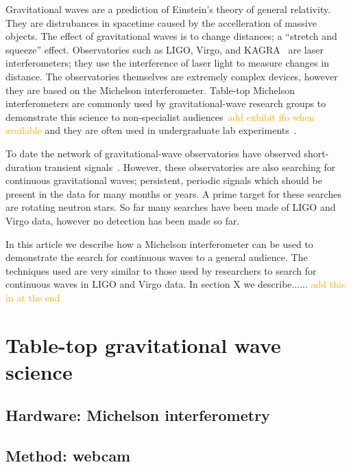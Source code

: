 \documentclass[prb,preprint]{revtex4-1}
\newcommand{\han}{\textcolor{orange}}
\begin{document}
Gravitational waves are a prediction of Einstein's theory of general relativity. 
They are distrubances in spacetime caused by the accelleration of massive objects. 
The effect of gravitational waves is to change distances; a ``stretch and squeeze'' effect. 
Observatories such as LIGO, Virgo, and KAGRA~\cite{KAGRA:2013} are laser interferometers; they use the interference of laser light to measure changes in distance. 
The observatories themselves are extremely complex devices, however they are based on the Michelson interferometer. 
Table-top Michelson interferometers are commonly used by gravitational-wave research groups to demonstrate this science to non-specialist audiences~\cite{ThorLabsIFO,NikhefIFO}\han{add exhibit ifo when available} and they are often used in undergraduate lab experiments~\cite{UgoliniEtAl:2019}. 


To date the network of gravitational-wave observatories have observed short-duration transient signals~\cite{GWTC-1:2018,GWOSC:online}. 
However, these observatories are also searching for continuous gravitational waves; persistent, periodic signals which should be present in the data for many months or years. 
A prime target for these searches are rotating neutron stars. 
So far many searches have been made of LIGO and Virgo data, however no detection has been made so far.


In this article we describe how a Michelson interferometer can be used to demonstrate the search for continuous waves to a general audience. 
The techniques used are very similar to those used by researchers to search for continuous waves in LIGO and Virgo data. 
In section X we describe...... \han{add this in at the end}


\section{Table-top gravitational wave science}

\subsection{Hardware: Michelson interferometry}

\subsection{Method: webcam}
\end{document}
